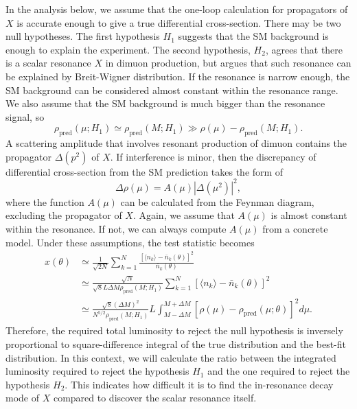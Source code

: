 \documentclass[11pt]{article}
\theoremstyle{definition}
\theoremstyle{remark}
\begin{document}
	In the analysis below, we assume that the one-loop calculation for propagators of $X$ is accurate enough to give a true differential cross-section.
	There may be two null hypotheses.
	The first hypothesis $H_{1}$ suggests that the SM background is enough to explain the experiment.
	The second hypothesis, $H_{2}$, agrees that there is a scalar resonance $X$ in dimuon production, but argues that such resonance can be explained by Breit-Wigner distribution.
	If the resonance is narrow enough, the SM background can be considered almost constant within the resonance range.
	We also assume that the SM background is much bigger than the resonance signal, so
	\[\rho_{\text{pred}}(\mu;H_{1})\simeq\rho_{\text{pred}}(M;H_{1})\gg\rho(\mu)-\rho_{\text{pred}}(M;H_{1}).\]
	A scattering amplitude that involves resonant production of dimuon contains the propagator $\Delta(p^{2})$ of $X$.
	If interference is minor, then the discrepancy of differential cross-section from the SM prediction takes the form of
	\[\Delta\rho(\mu)=A(\mu)|\Delta(\mu^{2})|^{2},\]
	where the function $A(\mu)$ can be calculated from the Feynman diagram, excluding the propagator of $X$.
	Again, we assume that $A(\mu)$ is almost constant within the resonance.
	If not, we can always compute $A(\mu)$ from a concrete model.
	Under these assumptions, the test statistic becomes
	\begin{align*}
		x(\theta)&\simeq\frac{1}{\sqrt{2N}}\sum_{k=1}^{N}\frac{[\langle n_{k}\rangle-\bar{n}_{k}(\theta)]^{2}}{\bar{n}_{k}(\theta)}\\
		&\simeq\frac{\sqrt{N}}{\sqrt{8}L\Delta M\rho_{\text{pred}}(M;H_{1})}\sum_{k=1}^{N}[\langle n_{k}\rangle-\bar{n}_{k}(\theta)]^{2}\\
		&\simeq\frac{\sqrt{8}(\Delta M)^{2}}{N^{5/2}\rho_{\text{pred}}(M;H_{1})}L\int_{M-\Delta M}^{M+\Delta M}[\rho(\mu)-\rho_{\text{pred}}(\mu;\theta)]^{2}d\mu.
	\end{align*}
	Therefore, the required total luminosity to reject the null hypothesis is inversely proportional to square-difference integral of the true distribution and the best-fit distribution.
	In this context, we will calculate the ratio between the integrated luminosity required to reject the hypothesis $H_{1}$ and the one required to reject the hypothesis $H_{2}$.
	This indicates how difficult it is to find the in-resonance decay mode of $X$ compared to discover the scalar resonance itself.
	
\end{document}
